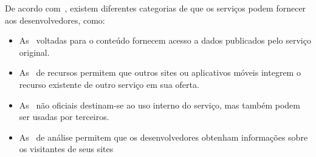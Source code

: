 De acordo com~\textcite{russel2019}, existem diferentes categorias de
 que os serviços podem fornecer aos desenvolvedores, como:

\begin{itemize}
    \item As~ voltadas para o conteúdo fornecem acesso a
    dados publicados pelo serviço original.
    \item As~ de recursos permitem que outros sites ou
    aplicativos móveis integrem o recurso existente de outro serviço em sua
    oferta.
    \item As~ não oficiais destinam-se ao uso interno do
    serviço, mas também podem ser usadas por terceiros.
    \item As~ de análise permitem que os desenvolvedores
    obtenham informações sobre os visitantes de seus sites
\end{itemize}


